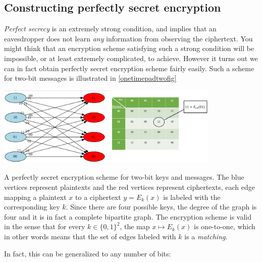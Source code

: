 \subsection{Constructing perfectly secret
encryption}\label{Constructing-perfectly-se}

\emph{Perfect secrecy} is an extremely strong condition, and implies
that an eavesdropper does not learn \emph{any} information from
observing the ciphertext. You might think that an encryption scheme
satisfying such a strong condition will be impossible, or at least
extremely complicated, to achieve. However it turns out we can in fact
obtain perfectly secret encryption scheme fairly easily. Such a scheme
for two-bit messages is illustrated in \cref{onetimepadtwofig}


\begin{marginfigure}
\centering
\includegraphics[width=\linewidth, height=1.5in, keepaspectratio]{../figure/onetimepadtwobits.png}
\caption{A perfectly secret encryption scheme for two-bit keys and
messages. The blue vertices represent plaintexts and the red vertices
represent ciphertexts, each edge mapping a plaintext \(x\) to a
ciphertext \(y=E_k(x)\) is labeled with the corresponding key \(k\).
Since there are four possible keys, the degree of the graph is four and
it is in fact a complete bipartite graph. The encryption scheme is valid
in the sense that for every \(k\in \{0,1\}^2\), the map
\(x \mapsto E_k(x)\) is one-to-one, which in other words means that the
set of edges labeled with \(k\) is a \emph{matching}.}
\label{onetimepadtwofig}
\end{marginfigure}

In fact, this can be generalized to any number of bits:

\hypertarget{onetimepad}{}

